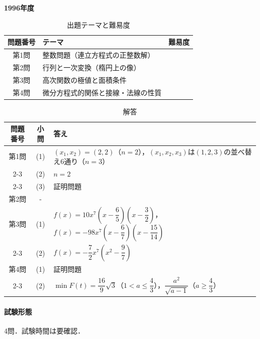 \documentclass[../../main.tex]{subfiles}
\begin{document}
\begin{center}
  {\fontsize{48pt}{58pt}\selectfont \textbf{1996}\normalsize\textbf{年度}}
\end{center}

\begin{table}[htb]
  \centering
  \caption{出題テーマと難易度}
  \begin{tabular}{|c|p{9cm}|c|}
    \hline
    \textbf{問題番号} & \textbf{テーマ} & \textbf{難易度} \\
    \hline
    第1問 & 整数問題（連立方程式の正整数解） & \\
    \hline
    第2問 & 行列と一次変換（楕円上の像） & \\
    \hline
    第3問 & 高次関数の極値と面積条件 & \\
    \hline
    第4問 & 微分方程式的関係と接線・法線の性質 & \\
    \hline
  \end{tabular}
\end{table}

\begin{table}[htb]
  \centering
  \caption{解答}
  \renewcommand{\arraystretch}{1.4}
  \begin{tabular}{|c|c|p{9cm}|}
    \hline
    \textbf{問題番号} & \textbf{小問} & \textbf{答え} \\
    \hline
    第1問 & (1) & $(x_1,x_2)=(2,2)$（$n=2$），$(x_1,x_2,x_3)$は$(1,2,3)$の並べ替え6通り（$n=3$） \\
    \cline{2-3}
    & (2) & $n=2$ \\
    \cline{2-3}
    & (3) & 証明問題 \\
    \hline
    第2問 & - &  \\
    \hline
    第3問 & (1) & $f(x)=10x^7\left(x-\dfrac{6}{5}\right)\left(x-\dfrac{3}{2}\right)$，$f(x)=-98x^7\left(x-\dfrac{6}{7}\right)\left(x-\dfrac{15}{14}\right)$ \\
    \cline{2-3}
    & (2) & $f(x)=-\dfrac{7}{2}x^7\left(x^2-\dfrac{9}{7}\right)$ \\
    \hline
    第4問 & (1) & 証明問題 \\
    \cline{2-3}
    & (2) & $\min F(t)=\dfrac{16}{9}\sqrt{3}$（$1<a\le\dfrac{4}{3}$），$\dfrac{a^2}{\sqrt{a-1}}$（$a\ge\dfrac{4}{3}$） \\
    \hline
  \end{tabular}
\end{table}

\paragraph{試験形態}
4問．試験時間は要確認．
\end{document}
